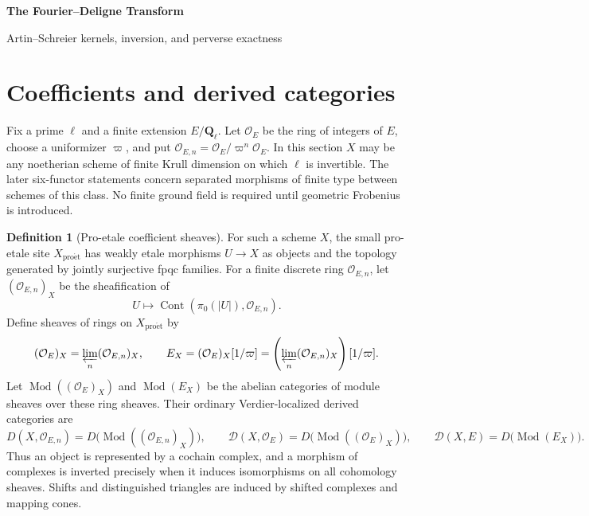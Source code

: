 \documentclass[10pt]{article}
\theoremstyle{definition}
\newtheorem{definition}[theorem]{Definition}
\newcommand{\Ql}{\mathbf Q_\ell}
\newcommand{\OO}{\mathcal O}
\newcommand{\Db}{\mathcal D}
\begin{document}
\begin{center}
{\large\bfseries The Fourier--Deligne Transform\par}
\medskip
{\normalsize Artin--Schreier kernels, inversion, and perverse exactness\par}
\end{center}

\begin{abstract}
This note fixes the Fourier--Deligne transform with all maps, categories,
shifts, and Tate twists displayed.  It records its constructibility, base
change, inversion, duality, perversity, and convolution properties.  The
discussion takes place in ordinary triangulated derived categories.
\end{abstract}
\tableofcontents

\section{Coefficients and derived categories}

Fix a prime \(\ell\) and a finite extension \(E/\Ql\).  Let \(\OO_E\) be
the ring of integers of \(E\), choose a uniformizer \(\varpi\), and put
\(\OO_{E,n}=\OO_E/\varpi^n\OO_E\).  In this section \(X\) may be any
noetherian scheme of finite Krull dimension on which \(\ell\) is invertible.
The later six-functor statements concern separated morphisms of finite type
between schemes of this class.  No finite ground field is required until
geometric Frobenius is introduced.

\begin{definition}[Pro-etale coefficient sheaves]
For such a scheme \(X\), the small pro-etale site
\(X_{\mathrm{pro\acute et}}\) has weakly etale morphisms \(U\to X\) as
objects and the topology generated by jointly surjective fpqc families.
For a finite discrete ring \(\OO_{E,n}\), let \((\OO_{E,n})_X\) be the
sheafification of
\[
 U\longmapsto
 \operatorname{Cont}\!\left(\pi_0(|U|),\OO_{E,n}\right).
\]
Define sheaves of rings on \(X_{\mathrm{pro\acute et}}\) by
\[
 (\OO_E)_X=\varprojlim_n(\OO_{E,n})_X,
 \qquad
 E_X=(\OO_E)_X[1/\varpi]
     =\left(\varprojlim_n(\OO_{E,n})_X\right)[1/\varpi].
\]
Let \(\operatorname{Mod}((\OO_E)_X)\) and
\(\operatorname{Mod}(E_X)\) be the abelian categories of module sheaves
over these ring sheaves.  Their ordinary Verdier-localized derived
categories are
\[
 D(X,\OO_{E,n})=D\bigl(\operatorname{Mod}((\OO_{E,n})_X)\bigr),
 \qquad
 \Db(X,\OO_E)=D\bigl(\operatorname{Mod}((\OO_E)_X)\bigr),
 \qquad
 \Db(X,E)=D\bigl(\operatorname{Mod}(E_X)\bigr).
\]
Thus an object is represented by a cochain complex, and a morphism of
complexes is inverted precisely when it induces isomorphisms on all
cohomology sheaves.  Shifts and distinguished triangles are induced by
shifted complexes and mapping cones.
\end{definition}
\end{document}
